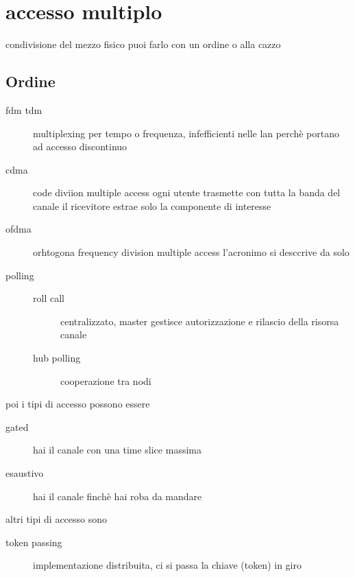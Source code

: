 \documentclass[11pt]{article}
\author{Biggie Dickus}
\date{\today}
\title{}
\begin{document}
\tableofcontents

\section{accesso multiplo}
\label{sec:org8b907e0}
condivisione del mezzo fisico
puoi farlo con un ordine o alla cazzo
\subsection{Ordine}
\label{sec:org81057b0}
\begin{description}
\item[{fdm tdm}] multiplexing per tempo o frequenza, infefficienti nelle lan perchè portano ad accesso discontinuo
\item[{cdma}] code diviion multiple access
ogni utente trasmette con tutta la banda del canale
il ricevitore estrae solo la componente di interesse
\item[{ofdma}] orhtogona frequency division multiple access
l'acronimo si desccrive da solo
\item[{polling}] \begin{description}
\item[{roll call}] centralizzato, master gestisce autorizzazione e rilascio della risorsa canale
\item[{hub polling}] cooperazione tra nodi
\end{description}
\end{description}

poi i tipi di accesso possono essere
\begin{description}
\item[{gated}] hai il canale con una time slice massima
\item[{esaustivo}] hai il canale finchè hai roba da mandare
\end{description}

altri tipi di accesso sono
\begin{description}
\item[{token passing}] implementazione distribuita, ci si passa la chiave (token) in giro
\end{description}
\end{document}
